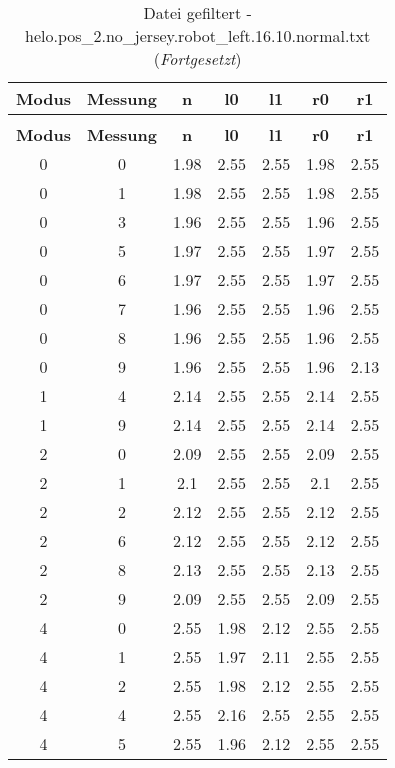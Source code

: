 \begin{longtable}{|c|c||c||c|c||c|c|}
	\caption{Datei gefiltert - helo.pos\_2.no\_jersey.robot\_left.16.10.normal.txt} \label{tab:helo.pos-2.no-jersey.robot-left.16.10.normal.txt} \\ \hline
	\textbf{Modus} & \textbf{Messung} & \textbf{n} & \textbf{l0} & \textbf{l1} & \textbf{r0} & \textbf{r1}\\ \hline
	\endfirsthead
	\caption[]{Datei gefiltert - helo.pos\_2.no\_jersey.robot\_left.16.10.normal.txt (\emph{Fortgesetzt})} \\ \hline
	\textbf{Modus} & \textbf{Messung} & \textbf{n} & \textbf{l0} & \textbf{l1} & \textbf{r0} & \textbf{r1}\\ \hline
	\endhead
	0 & 0 & 1.98 & 2.55 & 2.55 & 1.98 & 2.55 \\ \hline
	0 & 1 & 1.98 & 2.55 & 2.55 & 1.98 & 2.55 \\ \hline
	0 & 3 & 1.96 & 2.55 & 2.55 & 1.96 & 2.55 \\ \hline
	0 & 5 & 1.97 & 2.55 & 2.55 & 1.97 & 2.55 \\ \hline
	0 & 6 & 1.97 & 2.55 & 2.55 & 1.97 & 2.55 \\ \hline
	0 & 7 & 1.96 & 2.55 & 2.55 & 1.96 & 2.55 \\ \hline
	0 & 8 & 1.96 & 2.55 & 2.55 & 1.96 & 2.55 \\ \hline
	0 & 9 & 1.96 & 2.55 & 2.55 & 1.96 & 2.13 \\ \hline
	1 & 4 & 2.14 & 2.55 & 2.55 & 2.14 & 2.55 \\ \hline
	1 & 9 & 2.14 & 2.55 & 2.55 & 2.14 & 2.55 \\ \hline
	2 & 0 & 2.09 & 2.55 & 2.55 & 2.09 & 2.55 \\ \hline
	2 & 1 & 2.1 & 2.55 & 2.55 & 2.1 & 2.55 \\ \hline
	2 & 2 & 2.12 & 2.55 & 2.55 & 2.12 & 2.55 \\ \hline
	2 & 6 & 2.12 & 2.55 & 2.55 & 2.12 & 2.55 \\ \hline
	2 & 8 & 2.13 & 2.55 & 2.55 & 2.13 & 2.55 \\ \hline
	2 & 9 & 2.09 & 2.55 & 2.55 & 2.09 & 2.55 \\ \hline
	4 & 0 & 2.55 & 1.98 & 2.12 & 2.55 & 2.55 \\ \hline
	4 & 1 & 2.55 & 1.97 & 2.11 & 2.55 & 2.55 \\ \hline
	4 & 2 & 2.55 & 1.98 & 2.12 & 2.55 & 2.55 \\ \hline
	4 & 4 & 2.55 & 2.16 & 2.55 & 2.55 & 2.55 \\ \hline
	4 & 5 & 2.55 & 1.96 & 2.12 & 2.55 & 2.55 \\ \hline

\end{longtable}
